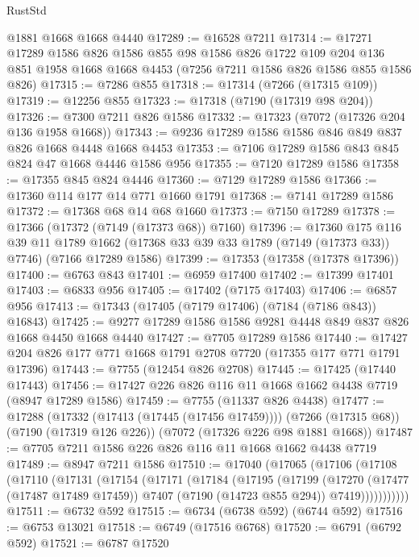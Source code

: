\begin{lexlean}{RustStd}
\begin{coremodule}
    @1881
    @1668
    @1668
    @4440
@17289 := @16528 @7211
@17314 := @17271
    @17289
    @1586
    @826
    @1586
    @855
    @98
    @1586
    @826
    @1722
    @109
    @204
    @136
    @851
    @1958
    @1668
    @1668
    @4453
    (@7256 @7211 @1586 @826 @1586 @855 @1586 @826)
@17315 := @7286 @855
@17318 := @17314 (@7266 (@17315 @109))
@17319 := @12256 @855
@17323 := @17318 (@7190 (@17319 @98 @204))
@17326 := @7300 @7211 @826 @1586
@17332 := @17323 (@7072 (@17326 @204 @136 @1958 @1668))
@17343 := @9236 @17289 @1586 @1586 @846 @849 @837 @826 @1668 @4448 @1668 @4453
@17353 := @7106 @17289 @1586 @843 @845 @824 @47 @1668 @4446 @1586 @956
@17355 := @7120 @17289 @1586
@17358 := @17355 @845 @824 @4446
@17360 := @7129 @17289 @1586
@17366 := @17360 @114 @177 @14 @771 @1660 @1791
@17368 := @7141 @17289 @1586
@17372 := @17368 @68 @14 @68 @1660
@17373 := @7150 @17289
@17378 := @17366 (@17372 (@7149 (@17373 @68)) @7160)
@17396 := @17360
    @175
    @116
    @39
    @11
    @1789
    @1662
    (@17368 @33 @39 @33 @1789 (@7149 (@17373 @33)) @7746)
    (@7166 @17289 @1586)
@17399 := @17353 (@17358 (@17378 @17396))
@17400 := @6763 @843
@17401 := @6959 @17400
@17402 := @17399 @17401
@17403 := @6833 @956
@17405 := @17402 (@7175 @17403)
@17406 := @6857 @956
@17413 := @17343 (@17405 (@7179 @17406) (@7184 (@7186 @843)) @16843)
@17425 := @9277 @17289 @1586 @1586 @9281 @4448 @849 @837 @826 @1668 @4450 @1668 @4440
@17427 := @7705 @17289 @1586
@17440 := @17427 @204 @826 @177 @771 @1668 @1791 @2708 @7720 (@17355 @177 @771 @1791 @17396)
@17443 := @7755 (@12454 @826 @2708)
@17445 := @17425 (@17440 @17443)
@17456 := @17427 @226 @826 @116 @11 @1668 @1662 @4438 @7719 (@8947 @17289 @1586)
@17459 := @7755 (@11337 @826 @4438)
@17477 := @17288
    (@17332 (@17413 (@17445 (@17456 @17459))))
    (@7266 (@17315 @68))
    (@7190 (@17319 @126 @226))
    (@7072 (@17326 @226 @98 @1881 @1668))
@17487 := @7705 @7211 @1586 @226 @826 @116 @11 @1668 @1662 @4438 @7719
@17489 := @8947 @7211 @1586
@17510 := @17040
    (@17065
      (@17106
        (@17108
          (@17110
            (@17131
              (@17154
                (@17171
                  (@17184
                    (@17195
                      (@17199
                        (@17270
                          (@17477 (@17487 @17489 @17459))
                          @7407
                          (@7190 (@14723 @855 @294))
                          @7419)))))))))))
@17511 := @6732 @592
@17515 := @6734 (@6738 @592) (@6744 @592)
@17516 := @6753 @13021
@17518 := @6749 (@17516 @6768)
@17520 := @6791 (@6792 @592)
@17521 := @6787 @17520

\end{coremodule}
\end{lexlean}
